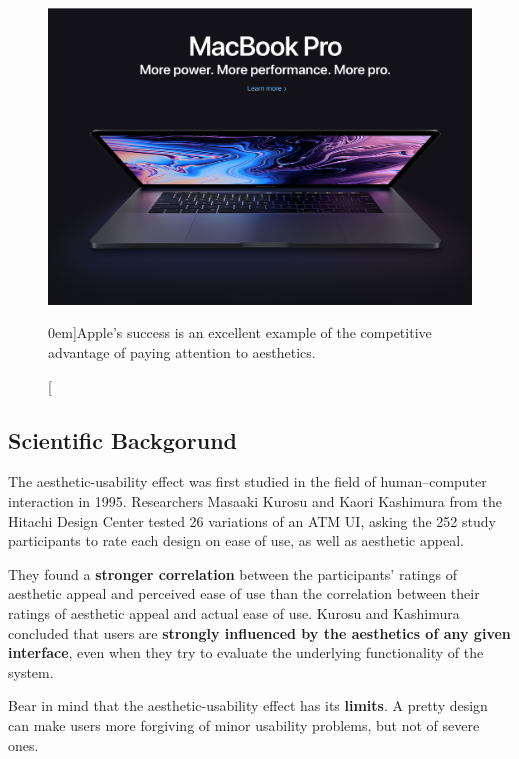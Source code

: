 \begin{figure}[!htb]%
  \includegraphics[width=1.0\textwidth]{../figures/apple_macbook.png}
  \caption[][0em]{Apple’s success is an excellent example of the competitive advantage of paying attention to aesthetics.}
  \label{fig:macbook}
\end{figure}

\subsection{Scientific Backgorund} %
\label{sub:history}

The aesthetic-usability effect was first studied in the field of human–computer interaction in 1995. Researchers Masaaki Kurosu and Kaori Kashimura from the Hitachi Design Center tested 26 variations of an ATM UI, asking the 252 study participants to rate each design on ease of use, as well as aesthetic appeal.

They found a \textbf{stronger correlation} between the participants’ ratings of aesthetic appeal and perceived ease of use than the correlation between their ratings of aesthetic appeal and actual ease of use. Kurosu and Kashimura concluded that users are \textbf{strongly influenced by the aesthetics of any given interface}, even when they try to evaluate the underlying functionality of the system.

Bear in mind that the aesthetic-usability effect has its \textbf{limits}. A pretty design can make users more forgiving of minor usability problems, but not of severe ones. 

